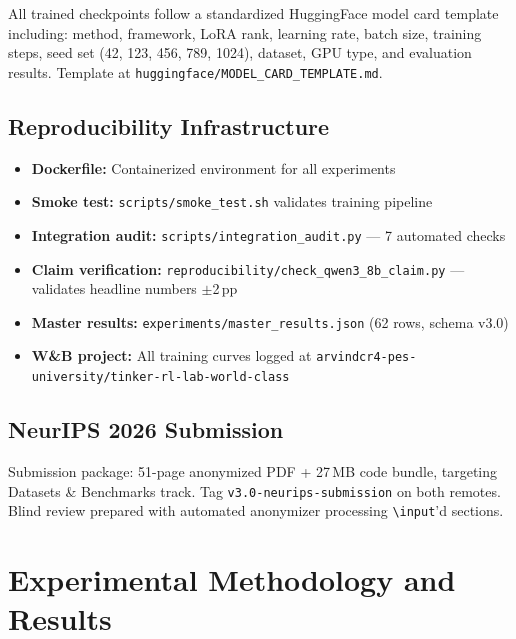 \documentclass[12pt,a4paper]{report}
\theoremstyle{definition}
\begin{document}
All trained checkpoints follow a standardized HuggingFace model card template including:
method, framework, LoRA rank, learning rate, batch size, training steps, seed set (42, 123, 456, 789, 1024),
dataset, GPU type, and evaluation results. Template at \texttt{huggingface/MODEL\_CARD\_TEMPLATE.md}.

\section{Reproducibility Infrastructure}
\label{sec:repro-infra}

\begin{itemize}[nosep]
\item \textbf{Dockerfile:} Containerized environment for all experiments
\item \textbf{Smoke test:} \texttt{scripts/smoke\_test.sh} validates training pipeline
\item \textbf{Integration audit:} \texttt{scripts/integration\_audit.py} --- 7 automated checks
\item \textbf{Claim verification:} \texttt{reproducibility/check\_qwen3\_8b\_claim.py} --- validates headline numbers $\pm$2\,pp
\item \textbf{Master results:} \texttt{experiments/master\_results.json} (62 rows, schema v3.0)
\item \textbf{W\&B project:} All training curves logged at \texttt{arvindcr4-pes-university/tinker-rl-lab-world-class}
\end{itemize}

\section{NeurIPS 2026 Submission}
\label{sec:neurips}

Submission package: 51-page anonymized PDF + 27\,MB code bundle, targeting Datasets \& Benchmarks track.
Tag \texttt{v3.0-neurips-submission} on both remotes. Blind review prepared with automated anonymizer
processing \texttt{\textbackslash input}'d sections.




\chapter{Experimental Methodology and Results}
\label{ch:experiments}
\end{document}
